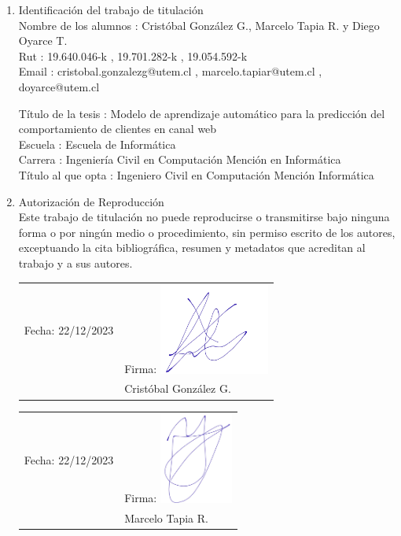 \begin{enumerate}
    \item Identificación del trabajo de titulación \\
    Nombre de los alumnos
    :   Cristóbal González G., Marcelo Tapia R. y Diego Oyarce T. \\
    Rut
    : 19.640.046-k , 19.701.282-k , 19.054.592-k \\
    Email
    : cristobal.gonzalezg@utem.cl , marcelo.tapiar@utem.cl , doyarce@utem.cl

    \vspace{0.1cm}

    Título de la tesis
    : Modelo de aprendizaje automático para la predicción del comportamiento de clientes en canal web \\
    Escuela
    : Escuela de Informática \\
    Carrera
    : Ingeniería Civil en Computación Mención en Informática \\
    Título al que opta
    : Ingeniero Civil en Computación Mención Informática \\
    \item Autorización de Reproducción \\
    Este trabajo de titulación no puede reproducirse o transmitirse bajo ninguna forma o por ningún medio o procedimiento, sin permiso escrito de los autores, exceptuando la cita bibliográfica, resumen y metadatos que acreditan al trabajo y a sus autores. \\

    \vspace{3cm}

    \begin{tabular}{@{}l l}
        Fecha: 22/12/2023 \hspace{3cm} & Firma: \includegraphics[height=3cm]{img/firma_Cris_tt.jpeg} \\
        & Cristóbal González G.
    \end{tabular}

    \vspace{3cm}

    \begin{tabular}{@{}l l}
        Fecha: 22/12/2023 \hspace{3cm} & Firma:  \includegraphics[height=3cm]{img/Firma Marcelo Tapia.jpg} \\
        & Marcelo Tapia R.
    \end{tabular}


\end{enumerate}
